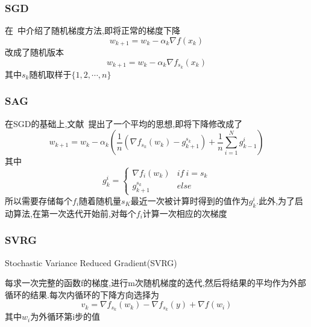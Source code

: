 \documentclass[UTF8]{ctexart}
\begin{document}
  \subsubsection{SGD}
  在~\cite{bottou2010large}中介绍了随机梯度方法,即将正常的梯度下降
  $$
  w_{k+1} = w_k-\alpha_k \nabla f(x_k)
  $$
  改成了随机版本
  $$
  w_{k+1} = w_k-\alpha_k \nabla f_{s_k}(x_k)
  $$
  其中$s_k$随机取样于$\{1,2,\cdots,n\}$
  \subsubsection{SAG}
  在SGD的基础上,文献~\cite{schmidt2017minimizing}提出了一个平均的思想,即将下降修改成了
  $$w_{k+1}=w_k-\alpha_k(\frac{1}{n}(\nabla f_{s_k}(w_k)-g_{k+1}^{s_k})+\frac{1}{n}\sum_{i=1}^{N}g_{k-1}^i)$$
  其中
  \begin{equation*}
    g_k^i= \left\{
    \begin{array}{cc}
      \nabla f_{i}(w_k) &if\ i=s_k\\
      g_{k+1}^{s_k} & else
    \end{array}
    \right.
  \end{equation*}
  所以需要存储每个$f_i$随着随机量$s_K$最近一次被计算时得到的值作为$g_k^i$.此外,为了启动算法,在第一次迭代开始前,对每个$f_i$计算一次相应的次梯度



  \subsubsection{SVRG}

\begin{algorithm}
    \SetAlgoNoLine %

    \BlankLine

    \caption{Stochastic Variance Reduced Gradient(SVRG)\label{al1}}
\end{algorithm}
  每求一次完整的函数f的梯度,进行m次随机梯度的迭代,然后将结果的平均作为外部循环的结果.每次内循环的下降方向选择为
  $$
  v_k=\nabla f_{s_k}(w_k)-\nabla f_{s_k}(y)+\nabla f(w_i)
$$
其中$w_i$为外循环第i步的值
\end{document}
